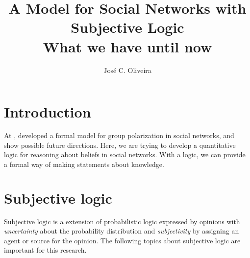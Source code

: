 \documentclass[a4paper,12pt]{article}
\title{A Model for Social Networks with Subjective Logic\\
\large{What we have until now}}
\author{José C. Oliveira}
\theoremstyle{definition}
\theoremstyle{theorem}
\numberwithin{equation}{section}
\begin{document}
\maketitle

\section{Introduction}

At \cite{DBLP:conf/birthday/AlvimKV19}, \citeauthor{DBLP:conf/birthday/AlvimKV19} developed a formal model for group polarization in social networks, and show possible future directions. Here, we are trying to develop a quantitative logic for reasoning about beliefs in social networks. With a logic, we can provide a formal way of making statements about knowledge.


\section{Subjective logic}

Subjective logic \cite{DBLP:books/sp/Josang16} is a extension of probabilistic logic expressed by opinions with \emph{uncertainty} about the probability distribution and \emph{subjectivity} by assigning an agent or source for the opinion. The following topics about subjective logic are important for this research.
\end{document}
